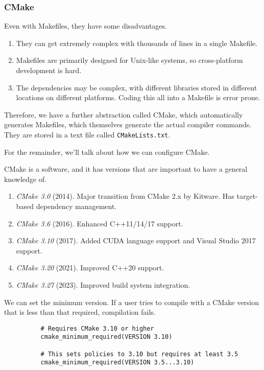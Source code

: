 \documentclass{article}
\begin{document}
    \subsubsection{CMake}

      Even with Makefiles, they have some disadvantages. 
      \begin{enumerate}
        \item They can get extremely complex with thousands of lines in a single Makefile. 
        \item Makefiles are primarily designed for Unix-like systems, so cross-platform development is hard. 
        \item The dependencies may be complex, with different libraries stored in different locations on different platforms. Coding this all into a Makefile is error prone. 
      \end{enumerate}

      \begin{definition}[CMake]
        Therefore, we have a further abstraction called CMake, which automatically generates Makefiles, which themselves generate the actual compiler commands. They are stored in a text file called \texttt{CMakeLists.txt}.
      \end{definition} 

      For the remainder, we'll talk about how we can configure CMake. 

      \begin{definition}[Version]
        CMake is a software, and it has versions that are important to have a general knowledge of. 
        \begin{enumerate}
          \item \textit{CMake 3.0} (2014). Major transition from CMake 2.x by Kitware. Has target-based dependency management. 
          \item \textit{CMake 3.6} (2016). Enhanced C++11/14/17 support. 
          \item \textit{CMake 3.10} (2017). Added CUDA language support and Visual Studio 2017 support. 
          \item \textit{CMake 3.20} (2021). Improved C++20 support. 
          \item \textit{CMake 3.27} (2023). Improved build system integration. 
        \end{enumerate}
        We can set the minimum version. If a user tries to compile with a CMake version that is less than that required, compilation fails. 
        \begin{lstlisting}
          # Requires CMake 3.10 or higher 
          cmake_minimum_required(VERSION 3.10)  

          # This sets policies to 3.10 but requires at least 3.5
          cmake_minimum_required(VERSION 3.5...3.10)
        \end{lstlisting}
      \end{definition}
\end{document}
